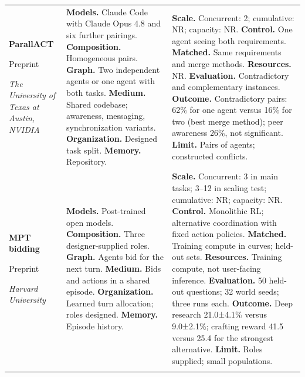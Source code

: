 \begin{longtable}{@{}>{\raggedright\arraybackslash}p{}>{\raggedright\arraybackslash}p{}>{\raggedright\arraybackslash}p{}@{}}
\textbf{ParallACT}\par \citep{parallact-shared-codebases}\par Preprint\par\emph{The University of Texas at Austin, NVIDIA} & \textbf{Models.} Claude Code with Claude Opus 4.8 and six further pairings. \textbf{Composition.} Homogeneous pairs. \textbf{Graph.} Two independent agents or one agent with both tasks. \textbf{Medium.} Shared codebase; awareness, messaging, synchronization variants. \textbf{Organization.} Designed task split. \textbf{Memory.} Repository. & \textbf{Scale.} Concurrent: 2; cumulative: NR; capacity: NR. \textbf{Control.} One agent seeing both requirements. \textbf{Matched.} Same requirements and merge methods. \textbf{Resources.} NR. \textbf{Evaluation.} Contradictory and complementary instances. \textbf{Outcome.} Contradictory pairs: 62\% for one agent versus 16\% for two (best merge method); peer awareness 26\%, not significant. \textbf{Limit.} Pairs of agents; constructed conflicts. \\ \addlinespace[5pt]
\textbf{MPT bidding}\par \citep{mpt-self-orchestration}\par Preprint\par\emph{Harvard University} & \textbf{Models.} Post-trained open models. \textbf{Composition.} Three designer-supplied roles. \textbf{Graph.} Agents bid for the next turn. \textbf{Medium.} Bids and actions in a shared episode. \textbf{Organization.} Learned turn allocation; roles designed. \textbf{Memory.} Episode history. & \textbf{Scale.} Concurrent: 3 in main tasks; 3--12 in scaling test; cumulative: NR; capacity: NR. \textbf{Control.} Monolithic RL; alternative coordination with fixed action policies. \textbf{Matched.} Training compute in curves; held-out sets. \textbf{Resources.} Training compute, not user-facing inference. \textbf{Evaluation.} 50 held-out questions; 32 world seeds; three runs each. \textbf{Outcome.} Deep research 21.0±4.1\% versus 9.0±2.1\%; crafting reward 41.5 versus 25.4 for the strongest alternative. \textbf{Limit.} Roles supplied; small populations. \\ \addlinespace[5pt]

\end{longtable}

